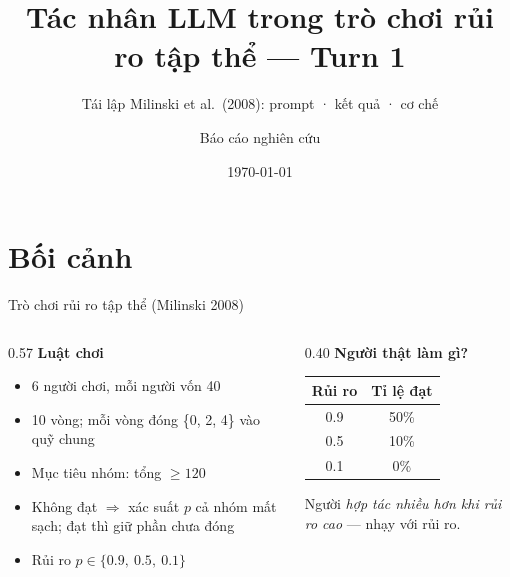 \documentclass[aspectratio=169,10pt]{beamer}
\title{Tác nhân LLM trong trò chơi rủi ro tập thể --- Turn 1}
\subtitle{Tái lập Milinski et al.\ (2008): prompt · kết quả · cơ chế}
\date{\today}
\author{Báo cáo nghiên cứu}
\newcommand{\take}[1]{\vfill{\footnotesize\textcolor{green!45!black}{#1}}}
\begin{document}
\maketitle

\section{Bối cảnh}

\begin{frame}{Trò chơi rủi ro tập thể (Milinski 2008)}
  \begin{columns}[T]
    \begin{column}{0.57\textwidth}
      \textbf{Luật chơi}
      \begin{itemize}\setlength\itemsep{3pt}
        \item 6 người chơi, mỗi người vốn 40
        \item 10 vòng; mỗi vòng đóng \{0, 2, 4\} vào quỹ chung
        \item \alert{Mục tiêu nhóm}: tổng $\geq 120$
        \item Không đạt $\Rightarrow$ xác suất $p$ cả nhóm \alert{mất sạch}; đạt thì giữ phần chưa đóng
        \item Rủi ro $p \in \{0.9,\ 0.5,\ 0.1\}$
      \end{itemize}
    \end{column}
    \begin{column}{0.40\textwidth}
      \textbf{Người thật làm gì?}
      \smallskip
      \begin{center}
      \setlength{\tabcolsep}{9pt}\renewcommand{\arraystretch}{1.2}
      \begin{tabular}{cc}
        \toprule
        Rủi ro & Tỉ lệ đạt \\
        \midrule
        0.9 & 50\% \\
        0.5 & 10\% \\
        0.1 & \phantom{0}0\% \\
        \bottomrule
      \end{tabular}
      \end{center}
      \take{Người \emph{hợp tác nhiều hơn khi rủi ro cao} --- nhạy với rủi ro.}
    \end{column}
  \end{columns}
\end{frame}
\end{document}
